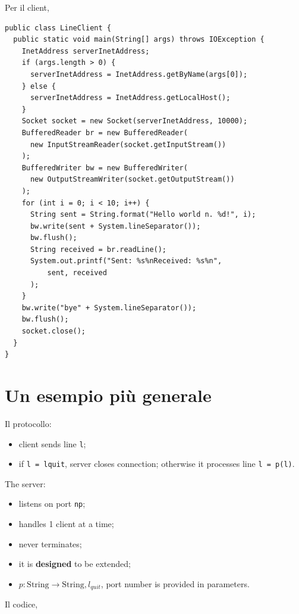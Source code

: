 \documentclass[\fontsizeclass,twocolumn]{\classname}
\theoremstyle{definition}
\theoremstyle{definition}
\begin{document}
Per il client,

\begin{lstlisting}
public class LineClient {
  public static void main(String[] args) throws IOException {
    InetAddress serverInetAddress;
    if (args.length > 0) {
      serverInetAddress = InetAddress.getByName(args[0]);
    } else {
      serverInetAddress = InetAddress.getLocalHost();
    }
    Socket socket = new Socket(serverInetAddress, 10000);
    BufferedReader br = new BufferedReader(
      new InputStreamReader(socket.getInputStream())
    );
    BufferedWriter bw = new BufferedWriter(
      new OutputStreamWriter(socket.getOutputStream())
    );
    for (int i = 0; i < 10; i++) {
      String sent = String.format("Hello world n. %d!", i);
      bw.write(sent + System.lineSeparator());
      bw.flush();
      String received = br.readLine();
      System.out.printf("Sent: %s%nReceived: %s%n",
          sent, received
      );
    }
    bw.write("bye" + System.lineSeparator());
    bw.flush();
    socket.close();
  }
}
\end{lstlisting}

\section{Un esempio più generale}

Il protocollo:
\begin{itemize}
    \item client sends line \texttt{l};
    \item if \texttt{l = lquit}, server closes connection; otherwise it
        processes line \texttt{l = p(l)}.
\end{itemize}

The server:
\begin{itemize}
    \item listens on port \texttt{np};
    \item handles 1 client at a time;
    \item never terminates;
    \item it is \textbf{designed} to be extended;
    \item $p : \mathrm{ String } \rightarrow \mathrm{ String }, l_{quit}$, port
        number is provided in parameters.
\end{itemize}


Il codice,
\end{document}
